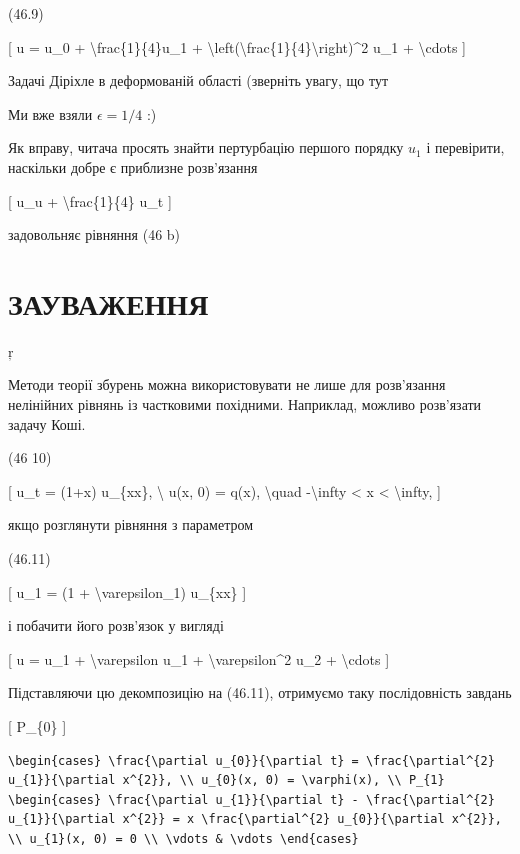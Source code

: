 \documentclass[
]{article}
\begin{document}
{(46.9)

{[} u = u\_0 + \textbackslash frac\{1\}\{4\}u\_1 +
\textbackslash left(\textbackslash frac\{1\}\{4\}\textbackslash right)\^{}2
u\_1 + \textbackslash cdots {]}

Задачі Діріхле в деформованій області (зверніть увагу, що тут

Ми вже взяли \(\epsilon = 1/4\) :)

Як вправу, читача просять знайти пертурбацію першого порядку \(u_1\) і
перевірити, наскільки добре є приблизне розв'язання

{[} u\_u + \textbackslash frac\{1\}\{4\} u\_t {]}

задовольняє рівняння (46 b)

\section{ЗАУВАЖЕННЯ}\label{ux437ux430ux443ux432ux430ux436ux435ux43dux43dux44f-7}

ŗ

Методи теорії збурень можна використовувати не лише для розв'язання
нелінійних рівнянь із частковими похідними. Наприклад, можливо
розв'язати задачу Коші.

(46 10)

{[} u\_t = (1+x) u\_\{xx\}, \textbackslash{} u(x, 0) = q(x),
\textbackslash quad -\textbackslash infty \textless{} x \textless{}
\textbackslash infty, {]}

якщо розглянути рівняння з параметром

(46.11)

{[} u\_1 = (1 + \textbackslash varepsilon\_1) u\_\{xx\} {]}

і побачити його розв'язок у вигляді

{[} u = u\_1 + \textbackslash varepsilon u\_1 +
\textbackslash varepsilon\^{}2 u\_2 + \textbackslash cdots {]}

Підставляючи цю декомпозицію на (46.11), отримуємо таку послідовність
завдань

{[} P\_\{0\} {]}

\begin{verbatim}
\begin{cases} \frac{\partial u_{0}}{\partial t} = \frac{\partial^{2} u_{1}}{\partial x^{2}}, \\ u_{0}(x, 0) = \varphi(x), \\ P_{1} \begin{cases} \frac{\partial u_{1}}{\partial t} - \frac{\partial^{2} u_{1}}{\partial x^{2}} = x \frac{\partial^{2} u_{0}}{\partial x^{2}}, \\ u_{1}(x, 0) = 0 \\ \vdots & \vdots \end{cases}
\end{verbatim}

}
\end{document}
